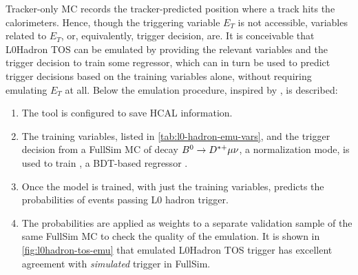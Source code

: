 Tracker-only MC records the tracker-predicted position where a track hits the
calorimeters.
Hence, though the triggering variable $E_T$ is not accessible,
variables related to $E_T$, or, equivalently, trigger decision, are.
It is conceivable that L0Hadron TOS can be emulated by providing
the relevant variables and the trigger decision to train some regressor,
which can in turn be used to predict trigger decisions based on the training
variables alone, without requiring emulating $E_T$ at all.
Below the emulation procedure, inspired by \cite{LHCb-INT-2019-025}, is
described:

\begin{enumerate}
    \item The  tool is configured to save HCAL
        information.
    \item The training variables, listed in \cref{tab:l0-hadron-emu-vars}, and
        the trigger decision from a FullSim MC of decay
        ${{B}^0} \rightarrow {\ensuremath{{D}^{*+}}} \mu \nu$, a normalization mode,
        is used to train \xgboost, a BDT-based regressor
        \cite{Chen:2016:XST:2939672.2939785}.
    \item Once the model is trained, with just the training variables,
        \xgboost predicts the probabilities of events passing L0 hadron trigger.
    \item The probabilities are applied as weights to a separate validation
        sample of the same FullSim MC to check the quality of the emulation.
        It is shown in \cref{fig:l0hadron-tos-emu} that emulated L0Hadron TOS
        trigger has excellent agreement with \emph{simulated} trigger in
        FullSim.
\end{enumerate}

